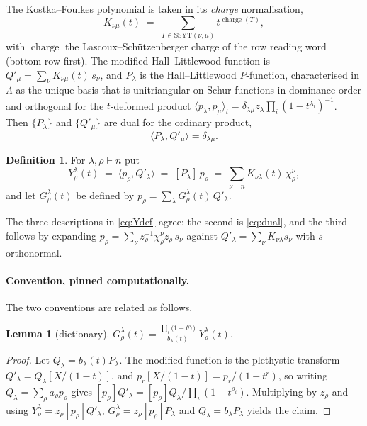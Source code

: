 \documentclass[11pt]{article}
\theoremstyle{plain}
\newtheorem{lemma}[theorem]{Lemma}
\theoremstyle{definition}
\newtheorem{definition}[theorem]{Definition}
\DeclareMathOperator{\ch}{charge}
\newcommand{\Qp}{Q'}
\newcommand{\lam}{\lambda}
\begin{document}
The Kostka--Foulkes polynomial is taken in its \emph{charge} normalisation,
\begin{equation}\label{eq:KF}
  K_{\nu\mu}(t)\;=\;\sum_{T\in\mathrm{SSYT}(\nu,\mu)} t^{\ch(T)},
\end{equation}
with $\ch$ the Lascoux--Sch\"utzenberger charge of the row reading word (bottom row first).
The modified Hall--Littlewood function is $\Qp_\mu=\sum_\nu K_{\nu\mu}(t)\,s_\nu$, and $P_\lam$
is the Hall--Littlewood $P$-function, characterised in $\Lambda$ as the unique basis that is
unitriangular on Schur functions in dominance order and orthogonal for the $t$-deformed product
$\langle p_\lam,p_\mu\rangle_t=\delta_{\lam\mu}z_\lam\prod_i(1-t^{\lam_i})^{-1}$. Then
$\{P_\lam\}$ and $\{\Qp_\mu\}$ are dual for the ordinary product,
\begin{equation}\label{eq:dual}
  \langle P_\lam,\Qp_\mu\rangle=\delta_{\lam\mu}.
\end{equation}

\begin{definition}
For $\lam,\rho\vdash n$ put
\begin{equation}\label{eq:Ydef}
  Y^{\lam}_{\rho}(t)\;=\;\langle p_\rho,\Qp_\lam\rangle\;=\;[P_\lam]\,p_\rho
  \;=\;\sum_{\nu\vdash n}K_{\nu\lam}(t)\,\chi^{\nu}_{\rho},
\end{equation}
and let $G^{\lam}_{\rho}(t)$ be defined by $p_\rho=\sum_\lam G^{\lam}_{\rho}(t)\,\Qp_\lam$.
\end{definition}

The three descriptions in \eqref{eq:Ydef} agree: the second is \eqref{eq:dual}, and the third
follows by expanding $p_\rho=\sum_\nu z_\rho^{-1}\chi^{\nu}_{\rho}z_\rho\,s_\nu$ against
$\Qp_\lam=\sum_\nu K_{\nu\lam}s_\nu$ with $s$ orthonormal.

\paragraph{Convention, pinned computationally.}
The two conventions are related as follows.

\begin{lemma}[dictionary]\label{lem:dict}
$\displaystyle G^{\lam}_{\rho}(t)=\frac{\prod_i\bigl(1-t^{\rho_i}\bigr)}{b_\lam(t)}\;Y^{\lam}_{\rho}(t).$
\end{lemma}

\begin{proof}
Let $Q_\lam=b_\lam(t)P_\lam$. The modified function is the plethystic transform
$\Qp_\lam=Q_\lam[X/(1-t)]$, and $p_r[X/(1-t)]=p_r/(1-t^r)$, so writing
$Q_\lam=\sum_\rho a_\rho p_\rho$ gives
$[p_\rho]\Qp_\lam=[p_\rho]Q_\lam\big/\prod_i(1-t^{\rho_i})$. Multiplying by $z_\rho$ and using
$Y^{\lam}_\rho=z_\rho[p_\rho]\Qp_\lam$, $G^{\lam}_\rho=z_\rho[p_\rho]P_\lam$ and
$Q_\lam=b_\lam P_\lam$ yields the claim.
\end{proof}
\end{document}
